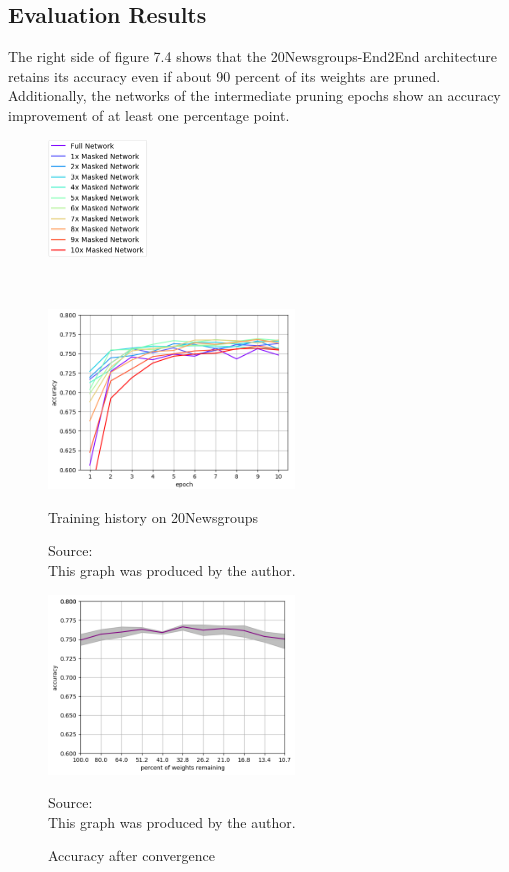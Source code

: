\subsection*{Evaluation Results}
The right side of figure 7.4 shows that the 20Newsgroups-End2End architecture retains its accuracy even if about 90 percent of its weights are pruned. Additionally, the networks of the intermediate pruning epochs show an accuracy improvement of at least one percentage point.
\begin{figure}
	\begin{minipage}{0.5\textwidth}
		\centering
		\includegraphics[width=100px]{gfx/7-Evaluation/20Newsgroups_legend.png}
	\end{minipage}
	\begin{minipage}{0.5\textwidth}
		\centering
	\end{minipage}
	\\
	\begin{minipage}{0.5\textwidth}
		\centering
		\includegraphics[height=180px]{gfx/Experiments/Transfer-20Newsgroups-CNN/accuracy/10_iterations.png}
		\caption{Training history on 20Newsgroups}
		\vspace{7pt}
		\footnotesize{
			Source:\\
			This graph was produced by the author.
		}
		\label{fig:20Newsgroups-Training}
	\end{minipage}\hfill
	\begin{minipage}{0.5\textwidth}
		\centering
		\includegraphics[height=180px]{gfx/Experiments/Transfer-20Newsgroups-CNN/accuracy/converged.png}
		\caption{Accuracy after convergence}
		\vspace{7pt}
		\footnotesize{
			Source:\\
			This graph was produced by the author.
		}
		\label{fig:20Newsgroups-Converged}
	\end{minipage}
\end{figure}

